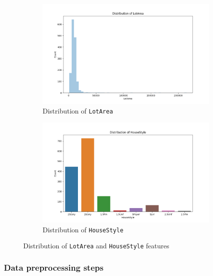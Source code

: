 \documentclass[10pt]{article}
\begin{document}
\begin{figure}[!htbp]
    \centering
    \begin{subfigure}[b]{0.9\textwidth}
        \centering
        \includegraphics[width=\textwidth]{../hw1/img/Part_I/LotArea.png}
        \caption{Distribution of \texttt{LotArea}}
    \end{subfigure}
    \hfill
    \begin{subfigure}[b]{0.9\textwidth}
        \centering
        \includegraphics[width=\textwidth]{../hw1/img/Part_I/HouseStyle.png}
        \caption{Distribution of \texttt{HouseStyle}}
    \end{subfigure}
    \caption{Distribution of \texttt{LotArea} and \texttt{HouseStyle} features}
    \label{fig:feature_distribution}
\end{figure}

\subsubsection{Data preprocessing steps}
\end{document}
